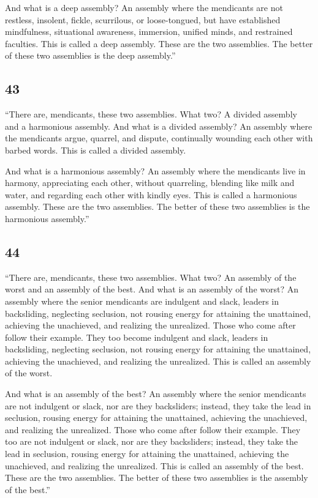 \documentclass[12pt,openany]{book}%
\begin{document}
And what is a deep assembly? An assembly where the mendicants are not restless, insolent, fickle, scurrilous, or loose-tongued, but have established mindfulness, situational awareness, immersion, unified minds, and restrained faculties. This is called a deep assembly. These are the two assemblies. The better of these two assemblies is the deep assembly.” 

\subsection*{43 }

“There are, mendicants, these two assemblies. What two? A divided assembly and a harmonious assembly. And what is a divided assembly? An assembly where the mendicants argue, quarrel, and dispute, continually wounding each other with barbed words. This is called a divided assembly. 

And what is a harmonious assembly? An assembly where the mendicants live in harmony, appreciating each other, without quarreling, blending like milk and water, and regarding each other with kindly eyes. This is called a harmonious assembly. These are the two assemblies. The better of these two assemblies is the harmonious assembly.” 

\subsection*{44 }

“There are, mendicants, these two assemblies. What two? An assembly of the worst and an assembly of the best. And what is an assembly of the worst? An assembly where the senior mendicants are indulgent and slack, leaders in backsliding, neglecting seclusion, not rousing energy for attaining the unattained, achieving the unachieved, and realizing the unrealized. Those who come after follow their example. They too become indulgent and slack, leaders in backsliding, neglecting seclusion, not rousing energy for attaining the unattained, achieving the unachieved, and realizing the unrealized. This is called an assembly of the worst. 

And what is an assembly of the best? An assembly where the senior mendicants are not indulgent or slack, nor are they backsliders; instead, they take the lead in seclusion, rousing energy for attaining the unattained, achieving the unachieved, and realizing the unrealized. Those who come after follow their example. They too are not indulgent or slack, nor are they backsliders; instead, they take the lead in seclusion, rousing energy for attaining the unattained, achieving the unachieved, and realizing the unrealized. This is called an assembly of the best. These are the two assemblies. The better of these two assemblies is the assembly of the best.” 
\end{document}
